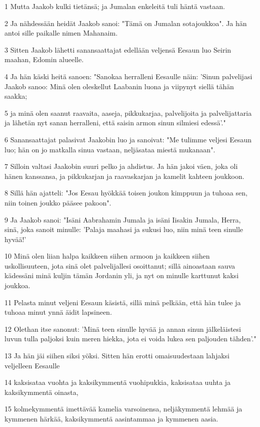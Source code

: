\par 1 Mutta Jaakob kulki tietänsä; ja Jumalan enkeleitä tuli häntä vastaan.
\par 2 Ja nähdessään heidät Jaakob sanoi: "Tämä on Jumalan sotajoukkoa". Ja hän antoi sille paikalle nimen Mahanaim.
\par 3 Sitten Jaakob lähetti sanansaattajat edellään veljensä Eesaun luo Seirin maahan, Edomin alueelle.
\par 4 Ja hän käski heitä sanoen: "Sanokaa herralleni Eesaulle näin: 'Sinun palvelijasi Jaakob sanoo: Minä olen oleskellut Laabanin luona ja viipynyt siellä tähän saakka;
\par 5 ja minä olen saanut raavaita, aaseja, pikkukarjaa, palvelijoita ja palvelijattaria ja lähetän nyt sanan herralleni, että saisin armon sinun silmiesi edessä'."
\par 6 Sanansaattajat palasivat Jaakobin luo ja sanoivat: "Me tulimme veljesi Eesaun luo; hän on jo matkalla sinua vastaan, neljäsataa miestä mukanaan".
\par 7 Silloin valtasi Jaakobin suuri pelko ja ahdistus. Ja hän jakoi väen, joka oli hänen kanssansa, ja pikkukarjan ja raavaskarjan ja kamelit kahteen joukkoon.
\par 8 Sillä hän ajatteli: "Jos Eesau hyökkää toisen joukon kimppuun ja tuhoaa sen, niin toinen joukko pääsee pakoon".
\par 9 Ja Jaakob sanoi: "Isäni Aabrahamin Jumala ja isäni Iisakin Jumala, Herra, sinä, joka sanoit minulle: 'Palaja maahasi ja sukusi luo, niin minä teen sinulle hyvää!'
\par 10 Minä olen liian halpa kaikkeen siihen armoon ja kaikkeen siihen uskollisuuteen, jota sinä olet palvelijallesi osoittanut; sillä ainoastaan sauva kädessäni minä kuljin tämän Jordanin yli, ja nyt on minulle karttunut kaksi joukkoa.
\par 11 Pelasta minut veljeni Eesaun käsistä, sillä minä pelkään, että hän tulee ja tuhoaa minut ynnä äidit lapsineen.
\par 12 Olethan itse sanonut: 'Minä teen sinulle hyvää ja annan sinun jälkeläistesi luvun tulla paljoksi kuin meren hiekka, jota ei voida lukea sen paljouden tähden'."
\par 13 Ja hän jäi siihen siksi yöksi. Sitten hän erotti omaisuudestaan lahjaksi veljelleen Eesaulle
\par 14 kaksisataa vuohta ja kaksikymmentä vuohipukkia, kaksisataa uuhta ja kaksikymmentä oinasta,
\par 15 kolmekymmentä imettävää kamelia varsoinensa, neljäkymmentä lehmää ja kymmenen härkää, kaksikymmentä aasintammaa ja kymmenen aasia.
